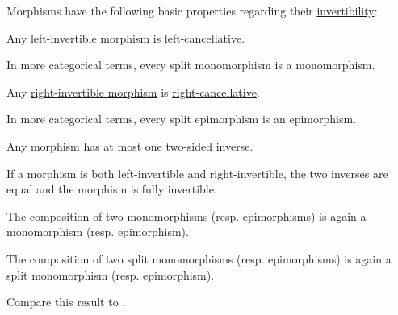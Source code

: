 \begin{proposition}\label{thm:morphism_invertibility_properties}
  Morphisms have the following basic properties regarding their \hyperref[def:morphism_invertibility]{invertibility}:

  \begin{thmenum}
     Any \hyperref[def:morphism_invertibility/left_invertible]{left-invertible morphism} is \hyperref[def:morphism_invertibility/left_cancellative]{left-cancellative}.

    In more categorical terms, every split monomorphism is a monomorphism.

     Any \hyperref[def:morphism_invertibility/right_invertible]{right-invertible morphism} is \hyperref[def:morphism_invertibility/right_cancellative]{right-cancellative}.

    In more categorical terms, every split epimorphism is an epimorphism.

     Any morphism has at most one two-sided inverse.

     If a morphism is both left-invertible and right-invertible, the two inverses are equal and the morphism is fully invertible.

     The composition of two monomorphisms (resp. epimorphisms) is again a monomorphism (resp. epimorphism).

     The composition of two split monomorphisms (resp. epimorphisms) is again a split monomorphism (resp. epimorphism).

    Compare this result to .
  \end{thmenum}
\end{proposition}
